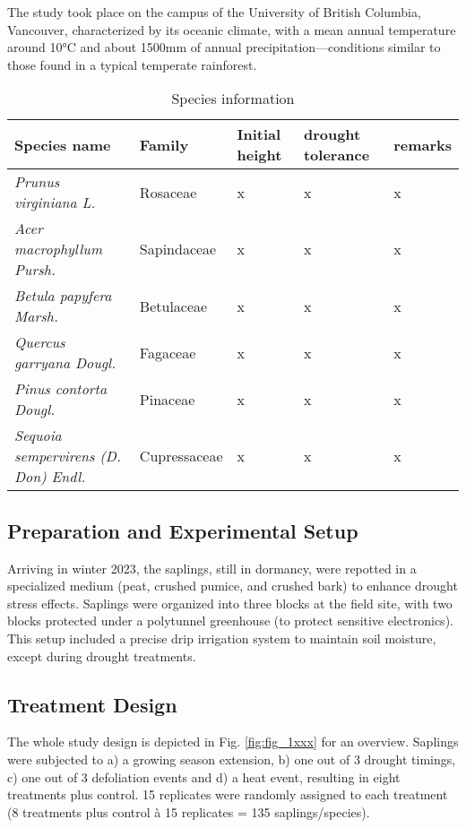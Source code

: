 \documentclass{article}
\begin{document}
	The study took place on the campus of the University of British Columbia, Vancouver, characterized by its oceanic climate, with a mean annual temperature around 10°C and about 1500mm of annual precipitation---conditions similar to those found in a typical temperate rainforest.
	
	\begin{table}[H]
		\centering
		\caption{Species information}
		\begin{tabular}{p{5.8cm} p{2cm} p{2.0cm} p{1.0cm} p{3cm}}
			\toprule
			\textbf{Species name} & \textbf{Family} & \textbf{Initial height} & \textbf{drought tolerance} & \textbf{remarks} \\
			\midrule
			\textit{Prunus virginiana L.} & Rosaceae & x & x &  x  \\
			\textit{Acer macrophyllum Pursh.} & Sapindaceae & x & x & x \\
			\textit{Betula papyfera Marsh.} & Betulaceae &x & x & x \\
			\textit{Quercus garryana Dougl.} & Fagaceae & x & x & x \\
			\textit{Pinus contorta Dougl.} & Pinaceae & x & x &  x\\
			\textit{Sequoia sempervirens (D. Don) Endl.} & Cupressaceae & x & x & x \\
			
			\bottomrule
		\end{tabular}
	\end{table}
	
	\subsection*{Preparation and Experimental Setup}
	Arriving in winter 2023, the saplings, still in dormancy, were repotted in a specialized medium (peat, crushed pumice, and crushed bark) to enhance drought stress effects. Saplings were organized into three blocks at the field site, with two blocks protected under a polytunnel greenhouse (to protect sensitive electronics). This setup included a precise drip irrigation system to maintain soil moisture, except during drought treatments.
	
	\subsection*{Treatment Design}
	
The whole study design is depicted in Fig. \ref{fig:fig_1xxx} for an overview. Saplings were subjected to a) a growing season extension, b) one out of 3 drought timings, c) one out of 3 defoliation events and d) a heat event, resulting in eight treatments plus control. 15 replicates were randomly assigned to each treatment (8 treatments plus control à 15 replicates = 135 saplings/species). \\  
\end{document}
